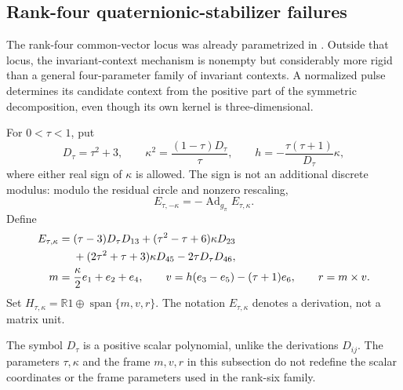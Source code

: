 \documentclass[11pt,a4paper]{article}
\newcommand{\RR}{\mathbb R}
\newcommand{\Ad}{\operatorname{Ad}}
\newcommand{\Span}{\operatorname{span}}
\begin{document}
\subsection{Rank-four quaternionic-stabilizer failures}
The rank-four common-vector locus was already parametrized in .  Outside that locus, the invariant-context mechanism is nonempty but considerably more rigid than a general four-parameter family of invariant contexts.  A normalized pulse determines its candidate context from the positive part of the symmetric decomposition, even though its own kernel is three-dimensional.

For $0<\tau<1$, put
\begin{equation}
 D_\tau=\tau^2+3,\qquad
 \kappa^2=\frac{(1-\tau)D_\tau}{\tau},\qquad
 h=-\frac{\tau(\tau+1)}{D_\tau}\kappa,
 \label{eq:rankfour-parameter}
\end{equation}
where either real sign of $\kappa$ is allowed.  The sign is not an additional discrete modulus: modulo the residual circle and nonzero rescaling,
\[
E_{\tau,-\kappa}=-\Ad_{g_\pi}E_{\tau,\kappa}.
\]
Define
\begin{align}
 E_{\tau,\kappa}={}&(\tau-3)D_\tau D_{13}
 +(\tau^2-\tau+6)\kappa D_{23}\notag\\
 &+(2\tau^2+\tau+3)\kappa D_{45}
 -2\tau D_\tau D_{46},
 \label{eq:rankfour-new-pulse}\\
 m={}&\frac\kappa2e_1+e_2+e_4,\qquad
 v=h(e_3-e_5)-(\tau+1)e_6,\qquad r=m\times v.
 \label{eq:rankfour-new-frame}
\end{align}
Set $H_{\tau,\kappa}=\RR1\oplus\Span\{m,v,r\}$.
The notation $E_{\tau,\kappa}$ denotes a derivation, not a matrix unit.

The symbol $D_\tau$ is a positive scalar polynomial, unlike the derivations $D_{ij}$.  The parameters $\tau,\kappa$ and the frame $m,v,r$ in this subsection do not redefine the scalar coordinates or the frame parameters used in the rank-six family.
\end{document}
